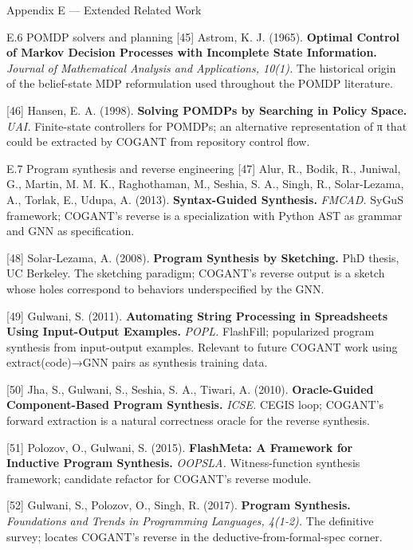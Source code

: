 \documentclass[
  ignorenonframetext,
]{beamer}
\begin{document}
\begin{frame}[fragile]{Appendix E --- Extended Related Work}
\begin{block}{E.6 POMDP solvers and planning}
{[}45{]} Astrom, K. J. (1965). \textbf{Optimal Control of Markov
Decision Processes with Incomplete State Information.} \emph{Journal of
Mathematical Analysis and Applications, 10(1).} The historical origin of
the belief-state MDP reformulation used throughout the POMDP literature.

{[}46{]} Hansen, E. A. (1998). \textbf{Solving POMDPs by Searching in
Policy Space.} \emph{UAI.} Finite-state controllers for POMDPs; an
alternative representation of π that could be extracted by COGANT from
repository control flow.
\end{block}

\begin{block}{E.7 Program synthesis and reverse engineering}
\protect{}\label{e.7-program-synthesis-and-reverse-engineering}
{[}47{]} Alur, R., Bodik, R., Juniwal, G., Martin, M. M. K.,
Raghothaman, M., Seshia, S. A., Singh, R., Solar-Lezama, A., Torlak, E.,
Udupa, A. (2013). \textbf{Syntax-Guided Synthesis.} \emph{FMCAD.} SyGuS
framework; COGANT's reverse is a specialization with Python AST as
grammar and GNN as specification.

{[}48{]} Solar-Lezama, A. (2008). \textbf{Program Synthesis by
Sketching.} PhD thesis, UC Berkeley. The sketching paradigm; COGANT's
reverse output is a sketch whose holes correspond to behaviors
underspecified by the GNN.

{[}49{]} Gulwani, S. (2011). \textbf{Automating String Processing in
Spreadsheets Using Input-Output Examples.} \emph{POPL.} FlashFill;
popularized program synthesis from input-output examples. Relevant to
future COGANT work using extract(code)→GNN pairs as synthesis training
data.

{[}50{]} Jha, S., Gulwani, S., Seshia, S. A., Tiwari, A. (2010).
\textbf{Oracle-Guided Component-Based Program Synthesis.} \emph{ICSE.}
CEGIS loop; COGANT's forward extraction is a natural correctness oracle
for the reverse synthesis.

{[}51{]} Polozov, O., Gulwani, S. (2015). \textbf{FlashMeta: A Framework
for Inductive Program Synthesis.} \emph{OOPSLA.} Witness-function
synthesis framework; candidate refactor for COGANT's reverse module.

{[}52{]} Gulwani, S., Polozov, O., Singh, R. (2017). \textbf{Program
Synthesis.} \emph{Foundations and Trends in Programming Languages,
4(1-2).} The definitive survey; locates COGANT's reverse in the
deductive-from-formal-spec corner.
\end{block}


\end{frame}
\end{document}
